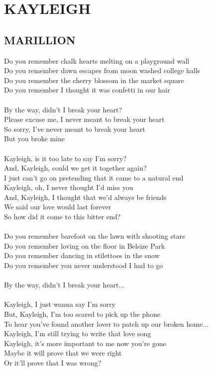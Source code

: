 \documentclass[a4paper]{report}
\newenvironment{song1}[2]{
     \section{\MakeUppercase{#1}}
	\subsection{\MakeUppercase{#2}}
	\Large
	\index[autorzy]{{#2}!{#1}}
	\index[piosenki]{#1}
    \begin{center}
    	\begin{varwidth}{\linewidth}}{
    	\end{varwidth}
    \end{center}
	\newpage
    }
\begin{document}
\begin{song1}{Kayleigh}{Marillion}

Do you remember chalk hearts melting on a playground wall\\
Do you remember dawn escapes from moon washed college halls\\
Do you remember the cherry blossom in the market square\\
Do you remember I thought it was confetti in our hair\\
\\
By the way, didn't I break your heart?\\
Please excuse me, I never meant to break your heart\\
So sorry, I've never meant to break your heart\\
But you broke mine\\
\\
Kayleigh, is it too late to say I'm sorry?\\
And, Kayleigh, could we get it together again?\\
I just can't go on pretending that it came to a natural end\\
Kayleigh, oh, I never thought I'd miss you\\
And, Kayleigh, I thought that we'd always be friends\\
We said our love would last forever\\
So how did it come to this bitter end?\\
\\
Do you remember barefoot on the lawn with shooting stars\\
Do you remember loving on the floor in Belsize Park\\
Do you remember dancing in stilettoes in the snow\\
Do you remember you never understood I had to go\\
\\
By the way, didn't I break your heart...\\
\\
Kayleigh, I just wanna say I'm sorry\\
But, Kayleigh, I'm too scared to pick up the phone\\
To hear you've found another lover to patch up our broken home...\\
Kayleigh, I'm still trying to write that love song\\
Kayleigh, it's more important to me now you're gone\\
Maybe it will prove that we were right\\
Or it'll prove that I was wrong?

\end{song1}
\end{document}
